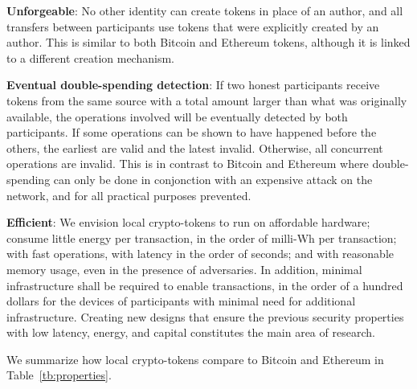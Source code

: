 \documentclass[sigconf,9pt]{acmart}
\begin{document}
\textbf{Unforgeable}: No other identity can create tokens in place of an author, and all transfers between participants use tokens that were explicitly created by an author. This is similar to both Bitcoin and Ethereum tokens, although it is linked to a different creation mechanism.

\textbf{Eventual double-spending detection}: If two honest participants receive tokens from the same source with a total amount larger than what was originally available, the operations involved will be eventually detected by both participants. If some operations can be shown to have happened before the others, the earliest are valid and the latest invalid. Otherwise, all concurrent operations are invalid. This is in contrast to Bitcoin and Ethereum where double-spending can only be done in conjonction with an expensive attack on the network, and for all practical purposes prevented. 

\textbf{Efficient}: We envision local crypto-tokens to run on affordable hardware; consume little energy per transaction, in the order of milli-Wh per transaction; with fast operations, with latency in the order of seconds; and with reasonable memory usage, even in the presence of adversaries. 
In addition, minimal infrastructure shall be required to enable transactions, in the order of a hundred dollars for the devices of participants with minimal need for additional infrastructure. Creating new designs that ensure the previous security properties with low latency, energy, and capital constitutes the main area of research.

We summarize how local crypto-tokens compare to Bitcoin and Ethereum in Table~\ref{tb:properties}.
\end{document}
